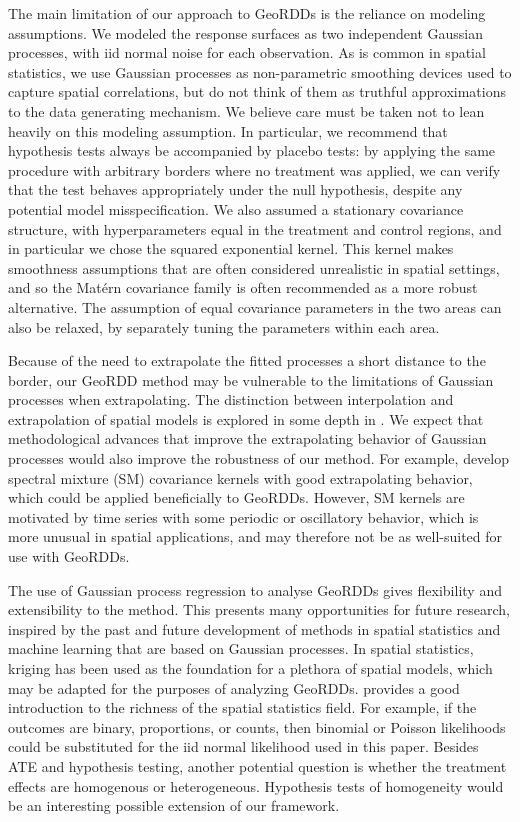 \documentclass[letter,12pt]{article}
\begin{document}
The main limitation of our approach to GeoRDDs is the reliance on modeling assumptions.
We modeled the response surfaces as two independent Gaussian processes, with iid normal noise for each observation.
As is common in spatial statistics, we use Gaussian processes as non-parametric smoothing devices used to capture spatial correlations, but do not think of them as truthful approximations to the data generating mechanism.
We believe care must be taken not to lean heavily on this modeling assumption.
In particular, we recommend that hypothesis tests always be accompanied by placebo tests:
by applying the same procedure with arbitrary borders where no treatment was applied, we can verify that the test behaves appropriately under the null hypothesis, despite any potential model misspecification.
We also assumed a stationary covariance structure, with hyperparameters equal in the treatment and control regions, and in particular we chose the squared exponential kernel.
This kernel makes smoothness assumptions that are often considered unrealistic in spatial settings, and so the Matérn covariance family is often recommended as a more robust alternative.
The assumption of equal covariance parameters in the two areas can also be relaxed, by separately tuning the parameters within each area.

Because of the need to extrapolate the fitted processes a short distance to the border, our GeoRDD method may be vulnerable to the limitations of Gaussian processes when extrapolating.
The distinction between interpolation and extrapolation of spatial models is explored in some depth in \cite{stein2012interpolation}.
We expect that methodological advances that improve the extrapolating behavior of Gaussian processes would also improve the robustness of our method.
For example, \cite{wilson2013gaussian} develop spectral mixture (SM) covariance kernels with good extrapolating behavior, which could be applied beneficially to GeoRDDs.
However, SM kernels are motivated by time series with some periodic or oscillatory behavior, which is more unusual in spatial applications, and may therefore not be as well-suited for use with GeoRDDs.

The use of Gaussian process regression to analyse GeoRDDs gives flexibility and extensibility to the method.
This presents many opportunities for future research, inspired by the past and future development of methods in spatial statistics and machine learning that are based on Gaussian processes.
In spatial statistics, kriging has been used as the foundation for a plethora of spatial models, which may be adapted for the purposes of analyzing GeoRDDs.
\cite{banerjee2014hierarchical} provides a good introduction to the richness of the spatial statistics field.
For example, if the outcomes are binary, proportions, or counts, then binomial or Poisson likelihoods could be substituted for the iid normal likelihood used in this paper.
Besides ATE and hypothesis testing, another potential question is whether the treatment effects are homogenous or heterogeneous.
Hypothesis tests of homogeneity would be an interesting possible extension of our framework.
\end{document}
